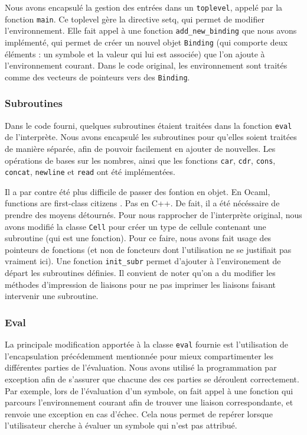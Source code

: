 \documentclass[a4paper,11pt]{article}
\begin{document}
  Nous avons encapsulé la gestion des entrées dans un \texttt{toplevel}, 
 appelé par la fonction \texttt{main}. Ce toplevel gère la directive setq, qui
 permet de modifier l'environnement. 
 Elle fait appel à une fonction \texttt{add\_new\_binding} que nous avons
 implémenté, qui permet de créer un nouvel objet
  \texttt{Binding} (qui comporte deux éléments : un
 symbole et la valeur qui lui est associée) que l'on ajoute à l'environnement courant. 
 Dans le code original, les environnement sont traités comme des vecteurs de pointeurs 
 vers des
 \texttt{Binding}.

 \subsubsection{Subroutines}
 
  Dans le code fourni, quelques subroutines étaient traitées dans la fonction 
  \texttt{eval} de l'interprète. Nous avons encapsulé les subroutines pour qu'elles soient 
  traitées de manière séparée, afin de pouvoir facilement en ajouter de nouvelles. 
  Les opérations de bases sur les nombres, ainsi que les fonctions \texttt{car}, 
  \texttt{cdr}, \texttt{cons}, \texttt{concat}, \texttt{newline} et \texttt{read} 
  ont été implémentées.

  Il a par contre été plus difficile de passer des fontion en objet. En Ocaml,
  \og functions are first-class citizens \og. Pas en C++. De fait, il a été
  nécéssaire de prendre des moyens détournés.
  Pour nous rapprocher de l'interprète original, nous avons modifié la classe
  \texttt{Cell} pour créer un type de cellule contenant une subroutine (qui est
  une fonction). Pour ce faire, nous avons fait usage des pointeurs de fonctions
  (et non de foncteurs dont l'utilisation ne se justifiait pas vraiment ici).
  Une fonction \texttt{init\_subr} permet d'ajouter à l'environement de départ
  les subroutines définies. Il convient de noter qu'on a du modifier les
  méthodes d'impression de liaisons pour ne pas imprimer les liaisons faisant
  intervenir une subroutine.
  
 \subsubsection{Eval}
 
 La principale modification apportée à la classe \texttt{eval} fournie est 
l'utilisation de l'encapsulation précédemment mentionnée pour mieux compartimenter 
les différentes parties de l'évaluation. Nous avons utilisé la programmation 
par exception afin de s'assurer que chacune des ces parties se déroulent 
correctement. Par exemple, lors de l'évaluation d'un symbole, on fait appel 
à une fonction qui parcours l'environnement courant afin de trouver une liaison 
correspondante, et renvoie une exception en cas d'échec. Cela nous permet de 
repérer lorsque l'utilisateur cherche à évaluer un symbole qui n'est pas attribué.
\end{document}
